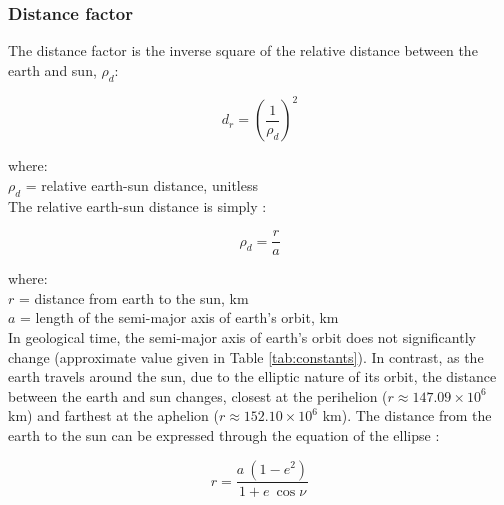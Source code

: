 \subsubsection{Distance factor}
\label{sec:dr}
The distance factor is the inverse square of the relative distance between the earth and sun, $\rho_{d}$:

\begin{equation}
\label{eq:dr}
    d_{r} = \left(\frac{1}{\rho_{d}}\right)^2
\end{equation}

\noindent where: \\
\indent $\rho_{d}$ = relative earth-sun distance, unitless \\

\noindent The relative earth-sun distance is simply \parencite{loutre03}:

\begin{equation}
\label{eq:rho}
    \rho_{d} = \frac{r}{a}
\end{equation}

\noindent where: \\
\indent $r$ = distance from earth to the sun, km \\
\indent $a$ = length of the semi-major axis of earth's orbit, km\\

\noindent In geological time, the semi-major axis of earth's orbit does not significantly change (approximate value given in Table \ref{tab:constants}). 
In contrast, as the earth travels around the sun, due to the elliptic nature of its orbit, the distance between the earth and sun changes, closest at the perihelion ($r \approx 147.09 \times 10^6$ km) and farthest at the aphelion ($r \approx 152.10 \times 10^6$ km). 
The distance from the earth to the sun can be expressed through the equation of the ellipse \parencite{loutre03}:

%
\begin{equation}
\label{eq:r}
    r = \frac{a \: \left(1 - e^2\right)}{1+e \: \cos \nu}
\end{equation}

